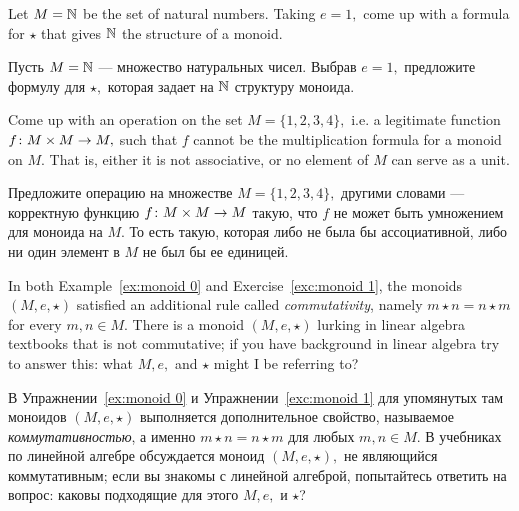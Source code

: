 \documentclass[../main/CT4S-EN-RU]{subfiles}
\begin{document}
\begin{exerciseENG}\label{exc:monoid 1}
Let $M={\mathbb N}$ be the set of natural numbers. Taking $e=1,$ come up with a formula for $\star$ that gives ${\mathbb N}$ the structure of a monoid.
\end{exerciseENG}

\begin{exerciseRUS}\label{exc:monoid 1}
Пусть $M={\mathbb N}$ — множество натуральных чисел. Выбрав $e=1,$ предложите формулу для $\star,$ которая задает на ${\mathbb N}$ структуру моноида.
\end{exerciseRUS}

\begin{exerciseENG}
Come up with an operation on the set $M=\{1,2,3,4\},$ i.e. a legitimate function $f\colon M\times M\rightarrow M,$ such that $f$ cannot be the multiplication formula for a monoid on $M.$ That is, either it is not associative, or no element of $M$ can serve as a unit.
\end{exerciseENG}

\begin{exerciseRUS}
Предложите операцию на множестве $M=\{1,2,3,4\},$ другими словами — корректную функцию $f\colon M\times M\rightarrow M$ такую, что $f$ не может быть умножением для моноида на $M.$ То есть такую, которая либо не была бы ассоциативной, либо ни один элемент в $M$ не был бы ее единицей.
\end{exerciseRUS}

\begin{exerciseENG}\label{ex:commutative monoid}
In both Example~\ref{ex:monoid 0} and Exercise~\ref{exc:monoid 1}, the monoids $(M,e,\star)$ satisfied an additional rule called {\em commutativity}, namely $m\star n=n\star m$ for every $m,n\in M.$ There is a monoid $(M,e,\star)$ lurking in linear algebra textbooks that is not commutative; if you have background in linear algebra try to answer this: what $M, e,$ and $\star$ might I be referring to?
\end{exerciseENG}

\begin{exerciseRUS}\label{ex:commutative monoid}
В Упражнении~\ref{ex:monoid 0} и Упражнении~\ref{exc:monoid 1} для упомянутых там моноидов $(M,e,\star)$ выполняется дополнительное свойство, называемое {\em коммутативностью}, а именно $m\star n=n\star m$ для любых $m,n\in M.$ В учебниках по линейной алгебре обсуждается моноид $(M,e,\star),$ не являющийся коммутативным; если вы знакомы с линейной алгеброй, попытайтесь ответить на вопрос: каковы подходящие для этого $M, e,$ и $\star$?
\end{exerciseRUS}
\end{document}
